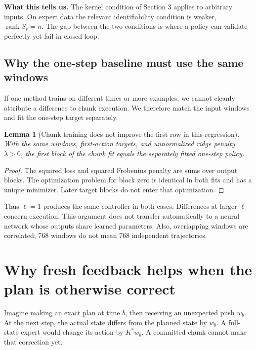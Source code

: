 \documentclass[12 pt]{article}        	%
\newtheorem{lemma}[theorem]{Lemma}
\theoremstyle{definition}
\DeclareMathOperator{\rank}{rank}
\begin{document}
\textbf{What this tells us.} The kernel condition of Section 3 applies to arbitrary inputs. On expert data the relevant identifiability condition is weaker, $\rank S_r=n$. The gap between the two conditions is where a policy can validate perfectly yet fail in closed loop.

\subsection{Why the one-step baseline must use the same windows}
If one method trains on different times or more examples, we cannot cleanly attribute a difference to chunk execution. We therefore match the input windows and fit the one-step target separately.
\begin{lemma}[Chunk training does not improve the first row in this regression]
With the same windows, first-action targets, and unnormalized ridge penalty $\lambda>0$, the first block of the chunk fit equals the separately fitted one-step policy.
\end{lemma}
\begin{proof}
The squared loss and squared Frobenius penalty are sums over output blocks. The optimization problem for block zero is identical in both fits and has a unique minimizer. Later target blocks do not enter that optimization.
\end{proof}
Thus $\ell=1$ produces the same controller in both cases. Differences at larger $\ell$ concern execution. This argument does not transfer automatically to a neural network whose outputs share learned parameters. Also, overlapping windows are correlated; 768 windows do not mean 768 independent trajectories.

\section{Why fresh feedback helps when the plan is otherwise correct}
Imagine making an exact plan at time $b$, then receiving an unexpected push $w_b$. At the next step, the actual state differs from the planned state by $w_b$. A full-state expert would change its action by $K^*w_b$. A committed chunk cannot make that correction yet.
\end{document}
